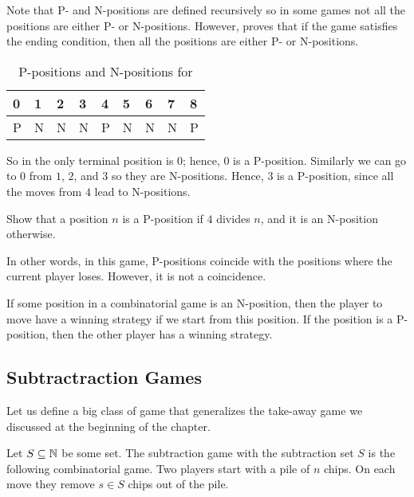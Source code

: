 Note that P- and N-positions are defined recursively so in some games not all
the positions are either P- or N-positions. However, 
proves that if the game satisfies the ending condition, then all the positions
are either P- or N-positions.


\begin{table}[h!]
  \centering
  \begin{tabular}{l l l l l l l l l}
      \toprule
      0 & 1 & 2 & 3 & 4 & 5 & 6 & 7 & 8 \\
      \midrule
      P & N & N & N & P & N & N & N & P \\
      \bottomrule
  \end{tabular}
  \caption{P-positions and N-positions for }
  \label{table:take-away-21-3-2-1}
\end{table}


So in  the only terminal position is $0$;
hence, $0$ is a P-position. Similarly we can go to $0$ from $1$, $2$, and
$3$ so they are N-positions. Hence, $3$ is a P-position,
since all the moves from $4$ lead to N-positions.
\begin{exercise}
  Show that a position $n$ is a P-position if $4$ divides $n$, and
  it is an N-position otherwise.
\end{exercise}

In other words, in this game, P-positions coincide with the positions where the
current player loses. However, it is not a coincidence.
\begin{theorem}
  If some position in a combinatorial game is an N-position, then the player to
  move have a winning strategy if we start from this position. If the position
  is a P-position, then the other player has a winning strategy.
\end{theorem}

\subsection{Subtractraction Games}
Let us define a big class of game that generalizes the take-away game we
discussed at the beginning of the chapter.
\begin{game}
  Let $S \subseteq {\mathbb{N}}$ be some set. The subtraction game with the subtraction
  set $S$ is the following combinatorial game.
  Two players start with a pile of $n$ chips.
  On each move they remove $s \in S$ chips out of the pile.
\end{game}

